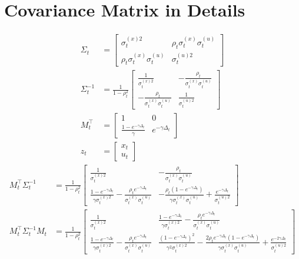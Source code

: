 \section{Covariance Matrix in Details}\label{covMatrixdetails}

\begin{align*}
\Sigma_t &= \begin{bmatrix}
\sigma_t^{\left(x\right)2} & \rho_{t} \sigma_t^{\left(x\right)} \sigma_t^{\left(u\right)}\\
 \rho_{t} \sigma_t^{\left(x\right)} \sigma_t^{\left(u\right)} & \sigma_t^{\left(u\right)2} 
\end{bmatrix}\\
\Sigma_t^{-1} &= \frac{1}{1-\rho_{t}^2} \begin{bmatrix} \frac{1}{\sigma_t^{\left(x\right)2}} & -\frac{\rho_{t}}{\sigma_t^{\left(x\right)} \sigma_t^{\left(u\right)} }\\
-\frac{\rho_{t}}{\sigma_t^{\left(x\right)} \sigma_t^{\left(u\right)} } & \frac{1}{\sigma_t^{\left(u\right)2}} \end{bmatrix}\\
M_t^\top &= \begin{bmatrix}
1 & 0 \\
\frac{1-e^{-\gamma \Delta_t}}{\gamma} & e^{-\gamma \Delta_t}
\end{bmatrix} \\
z_t &= \begin{bmatrix} x_t \\ u_t \end{bmatrix}
\end{align*}
\begin{align*}
M_t^\top \Sigma_t^{-1} &= \frac{1}{1-\rho_{t}^2} 
\begin{bmatrix}
\frac{1}{\sigma_t^{\left(x\right)2}}  & -\frac{\rho_{t}}{\sigma_t^{\left(x\right)} \sigma_t^{\left(u\right)} }\\
\frac{1-e^{-\gamma \Delta_t}}{\gamma\sigma_t^{\left(x\right)2}} -\frac{\rho_{t} e^{-\gamma \Delta_t}}{\sigma_t^{\left(x\right)} \sigma_t^{\left(u\right)} }  & 
 -\frac{\rho_{t} \left(1-e^{-\gamma \Delta_t}\right) }{ \gamma \sigma_t^{\left(x\right)} \sigma_t^{\left(u\right)} } + \frac{  e^{-\gamma\Delta_t} }{   \sigma_t^{\left(u\right)2} }
\end{bmatrix} \\
M_t^\top \Sigma_t^{-1} M_t&= \frac{1}{1-\rho_{t}^2} 
\begin{bmatrix}
\frac{1}{\sigma_t^{\left(x\right)2}}  &  \frac{1-e^{-\gamma\Delta_t}}{\gamma\sigma_t^{\left(x\right)2}} -\frac{\rho_{t} e^{-\gamma\Delta_t}}{\sigma_t^{\left(x\right)}\sigma_t^{\left(u\right)}} \\
\frac{1-e^{-\gamma \Delta_t}}{\gamma\sigma_t^{\left(x\right)2}} -\frac{\rho_{t} e^{-\gamma \Delta_t}}{\sigma_t^{\left(x\right)} \sigma_t^{\left(u\right)} }  & 
\frac{ \left(1-e^{-\gamma \Delta_t}\right)^2}{\gamma^2\sigma_t^{\left(x\right)2}} - \frac{2 \rho_{t} e^{-\gamma \Delta_t} \left(1-e^{-\gamma\Delta_t}\right) }{\gamma\sigma_t^{\left(x\right)} \sigma_t^{\left(u\right)} } +\frac{e^{-2\gamma\Delta_t}}{\sigma_t^{\left(u\right)2}}
\end{bmatrix} 
\end{align*}

